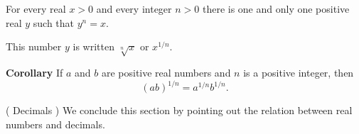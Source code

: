 \begin{thm}\label{thm:1.21}
    For every real $x > 0$ and every integer $n> 0$ there is one and only one positive real $y$ such that $y^n = x$.
\end{thm}

This number $y$ is written $\sqrt[n]{x}$ or $x^{1/n}$.

\textbf{Corollary} If $a$ and $b$ are positive real numbers and $n$ is a positive integer, then
\begin{equation*}
    (ab)^{1/n}= a^{1/n}b^{1/n}.
\end{equation*}

\begin{myDefinition}( Decimals )
    We conclude this section by pointing out the relation between real numbers and decimals.
\end{myDefinition}

